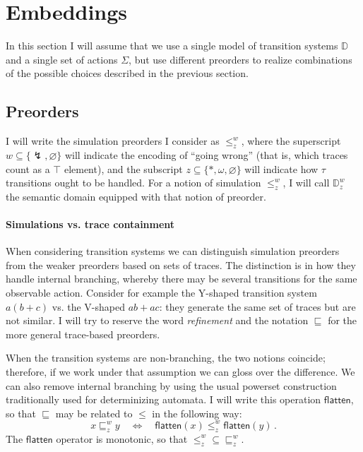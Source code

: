 \documentclass[11pt]{article}
\begin{document}


\section{Embeddings} %

In this section I will assume that we use
a single model of transition systems $\mathbb{D}$ and
a single set of actions $\Sigma$,
but use different preorders to
realize combinations of the possible choices
described in the previous section.

\subsection{Preorders} %

I will write the simulation preorders I consider as $\le^w_z$,
where the superscript $w \subseteq \{\lightning, \varnothing\}$ will indicate
the encoding of ``going wrong''
(that is, which traces count as a $\top$ element),
and the subscript $z \subseteq \{*, \omega, \varnothing\}$ will indicate
how $\tau$ transitions ought to be handled.
For a notion of simulation $\le^w_z$,
I will call $\mathbb{D}^w_z$
the semantic domain equipped with that notion of preorder.

\paragraph{Simulations vs. trace containment} %

When considering transition systems
we can distinguish simulation preorders
from the weaker preorders based on sets of traces.
The distinction is in how they handle internal branching,
whereby there may be several transitions for the same observable action.
Consider for example
the Y-shaped transition system $a(b + c)$ vs.
the V-shaped $ab + ac$:
they generate the same set of traces but are not similar.
I will try to reserve the word \emph{refinement}
and the notation $\sqsubseteq$
for the more general trace-based preorders.

When the transition systems are non-branching,
the two notions coincide;
therefore, if we work under that assumption
we can gloss over the difference.
We can also remove internal branching by using the usual
powerset construction traditionally used for determinizing automata.
I will write this operation $\mathsf{flatten}$,
so that $\sqsubseteq$ may be related to $\le$ in the following way:
\[ x \sqsubseteq^w_z y \quad \Leftrightarrow \quad
  \mathsf{flatten}(x) \le^w_z \mathsf{flatten}(y) \,. \]
The $\mathsf{flatten}$ operator is monotonic, so that
${\le}^w_z \subseteq {\sqsubseteq}^w_z$.
\end{document}
